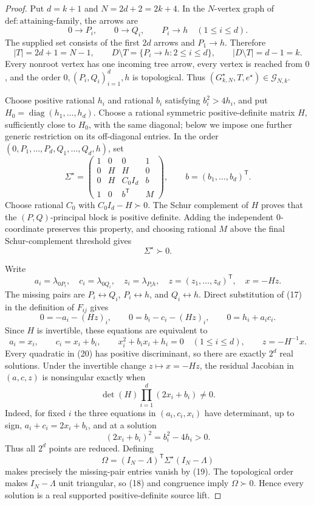\documentclass{article}
\begin{document}
\begin{proof}
Put \(d=k+1\) and \(N=2d+2=2k+4\).  In the \(N\)-vertex graph of \(\mathrm{def:attaining\mbox{-}family}\), the arrows are
\[
 0\to P_i,\qquad 0\to Q_i,\qquad P_i\to h
 \quad(1\le i\le d).
\]
The supplied set consists of the first \(2d\) arrows and \(P_1\to h\).  Therefore
\[
 |T|=2d+1=N-1,\qquad
 D\setminus T=\{P_i\to h:2\le i\le d\},\qquad
 |D\setminus T|=d-1=k.
\tag{16}
\]
Every nonroot vertex has one incoming tree arrow, every vertex is reached from \(0\), and the order \(0,(P_i,Q_i)_{i=1}^d,h\) is topological.  Thus \((G^{\star}_{k,N},T,e^{\star})\in\mathcal G_{N,k}\).

Choose positive rational \(h_i\) and rational \(b_i\) satisfying \(b_i^2>4h_i\), and put \(H_0=\operatorname{diag}(h_1,\ldots,h_d)\).  Choose a rational symmetric positive-definite matrix \(H\), sufficiently close to \(H_0\), with the same diagonal; below we impose one further generic restriction on its off-diagonal entries.  In the order \((0,P_1,\ldots,P_d,Q_1,\ldots,Q_d,h)\), set
\[
 \Sigma^{\star}=
 \begin{pmatrix}
  1&0&0&1\\
  0&H&H&0\\
  0&H&C_0I_d&b\\
  1&0&b^{\mathsf T}&M
 \end{pmatrix},
 \qquad b=(b_1,\ldots,b_d)^{\mathsf T}.
\tag{17}
\]
Choose rational \(C_0\) with \(C_0I_d-H\succ0\).  The Schur complement of \(H\) proves that the \((P,Q)\)-principal block is positive definite.  Adding the independent \(0\)-coordinate preserves this property, and choosing rational \(M\) above the final Schur-complement threshold gives
\[
 \Sigma^{\star}\succ0.
\tag{18}
\]

Write
\[
 a_i=\lambda_{0P_i},\quad c_i=\lambda_{0Q_i},\quad
 z_i=\lambda_{P_i h},\quad z=(z_1,\ldots,z_d)^{\mathsf T},
 \quad x=-Hz.
\]
The missing pairs are \(P_i\leftrightarrow Q_i\), \(P_i\leftrightarrow h\), and \(Q_i\leftrightarrow h\).  Direct substitution of (17) in the definition of \(F_{ij}\) gives
\[
 0=-a_i-(Hz)_i,\qquad
 0=b_i-c_i-(Hz)_i,\qquad
 0=h_i+a_ic_i.
\tag{19}
\]
Since \(H\) is invertible, these equations are equivalent to
\[
 a_i=x_i,\qquad c_i=x_i+b_i,\qquad
 x_i^2+b_ix_i+h_i=0\quad(1\le i\le d),\qquad
 z=-H^{-1}x.
\tag{20}
\]
Every quadratic in (20) has positive discriminant, so there are exactly \(2^d\) real solutions.  Under the invertible change \(z\mapsto x=-Hz\), the residual Jacobian in \((a,c,z)\) is nonsingular exactly when
\[
 \det(H)\prod_{i=1}^d(2x_i+b_i)\ne0.
\tag{21}
\]
Indeed, for fixed \(i\) the three equations in \((a_i,c_i,x_i)\) have determinant, up to sign, \(a_i+c_i=2x_i+b_i\), and at a solution
\[
 (2x_i+b_i)^2=b_i^2-4h_i>0.
\]
Thus all \(2^d\) points are reduced.  Defining
\[
 \Omega=(I_N-\Lambda)^{\mathsf T}\Sigma^{\star}(I_N-\Lambda)
\tag{22}
\]
makes precisely the missing-pair entries vanish by (19).  The topological order makes \(I_N-\Lambda\) unit triangular, so (18) and congruence imply \(\Omega\succ0\).  Hence every solution is a real supported positive-definite source lift.


\end{proof}
\end{document}
